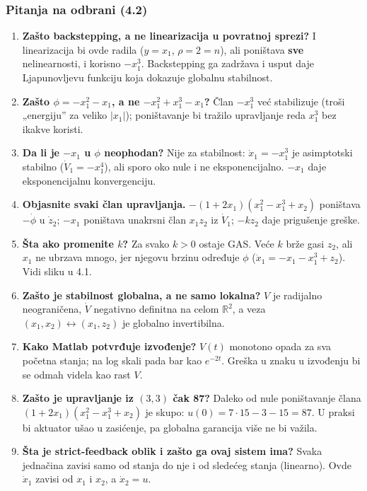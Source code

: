 \documentclass[11pt,a4paper,parskip=half,headsepline,numbers=noenddot]{scrartcl}
\begin{document}
\subsubsection{Pitanja na odbrani (4.2)}

\begin{enumerate}
\def\labelenumi{\arabic{enumi}.}
\item \textbf{Zašto backstepping, a ne linearizacija u povratnoj sprezi?} I linearizacija bi ovde radila (\(y = x_1\), \(\rho = 2 = n\)), ali poništava \textbf{sve} nelinearnosti, i korisno \(-x_1^3\). Backstepping ga zadržava i usput daje Ljapunovljevu funkciju koja dokazuje globalnu stabilnost.
\item \textbf{Zašto \(\phi = -x_1^2 - x_1\), a ne \(-x_1^2 + x_1^3 - x_1\)?} Član \(-x_1^3\) već stabilizuje (troši „energiju'' za veliko \(|x_1|\)); poništavanje bi tražilo upravljanje reda \(x_1^3\) bez ikakve koristi.
\item \textbf{Da li je \(-x_1\) u \(\phi\) neophodan?} Nije za stabilnost: \(\dot x_1 = -x_1^3\) je asimptotski stabilno (\(\dot V_1 = -x_1^4\)), ali sporo oko nule i ne eksponencijalno. \(-x_1\) daje eksponencijalnu konvergenciju.
\item \textbf{Objasnite svaki član upravljanja.} \(-(1 + 2x_1)(x_1^2 - x_1^3 + x_2)\) poništava \(-\dot\phi\) u \(\dot z_2\); \(-x_1\) poništava unakrsni član \(x_1z_2\) iz \(\dot V_1\); \(-kz_2\) daje prigušenje greške.
\item \textbf{Šta ako promenite \(k\)?} Za svako \(k > 0\) ostaje GAS. Veće \(k\) brže gasi \(z_2\), ali \(x_1\) ne ubrzava mnogo, jer njegovu brzinu određuje \(\phi\) (\(\dot x_1 = -x_1 - x_1^3 + z_2\)). Vidi sliku u 4.1.
\item \textbf{Zašto je stabilnost globalna, a ne samo lokalna?} \(V\) je radijalno neograničena, \(\dot V\) negativno definitna na celom \(\mathbb{R}^2\), a veza \((x_1, x_2) \leftrightarrow (x_1, z_2)\) je globalno invertibilna.
\item \textbf{Kako Matlab potvrđuje izvođenje?} \(V(t)\) monotono opada za sva početna stanja; na log skali pada bar kao \(e^{-2t}\). Greška u znaku u izvođenju bi se odmah videla kao rast \(V\).
\item \textbf{Zašto je upravljanje iz \((3, 3)\) čak 87?} Daleko od nule poništavanje člana \((1 + 2x_1)(x_1^2 - x_1^3 + x_2)\) je skupo: \(u(0) = 7 \cdot 15 - 3 - 15 = 87\). U praksi bi aktuator ušao u zasićenje, pa globalna garancija više ne bi važila.
\item \textbf{Šta je strict-feedback oblik i zašto ga ovaj sistem ima?} Svaka jednačina zavisi samo od stanja do nje i od sledećeg stanja (linearno). Ovde \(\dot x_1\) zavisi od \(x_1\) i \(x_2\), a \(\dot x_2 = u\).
\end{enumerate}
\end{document}
